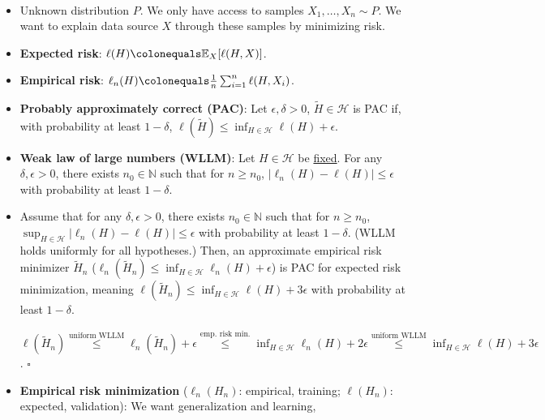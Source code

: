 \documentclass[8pt,a4paper]{extarticle}
\renewcommand{\proof}[1]{\begin{tcolorbox}#1 \hfill $\square$\end{tcolorbox}}
\newcommand{\E}{\mathbb{E}}
\newenvironment{topic}[1]
{\textbf{\sffamily \colorbox{black}{\rlap{\textbf{\textcolor{white}{#1}}}\hspace{\linewidth}\hspace{-2\fboxsep}}} \\ \vspace{0.2cm}}
{}
\begin{document}
\begin{multicols*}{2}
    \begin{topic}{Risk minimization}
        \begin{itemize}
            \item Unknown distribution $P$. We only have access to samples $X_1, \ldots, X_n \sim P$. We want to
                  explain data source $X$ through these samples by minimizing risk.
            \item \textbf{Expected risk}: $\ell(H) \colonequals \E_X[\ell(H, X)]$.
            \item \textbf{Empirical risk}: $\ell_n(H) \colonequals \frac{1}{n} \sum_{i=1}^{n} \ell(H, X_i)$.
            \item \textbf{Probably approximately correct (PAC)}: Let $\epsilon, \delta > 0$,
                  $\tilde{H} \in \mathcal{H}$ is PAC if, with probability at least $1-\delta$,
                  $\ell(\tilde{H}) \leq \inf_{H \in \mathcal{H}} \ell(H) + \epsilon$.
            \item \textbf{Weak law of large numbers (WLLM)}: Let $H \in \mathcal{H}$ be
                  \underline{fixed}. For any $\delta,\epsilon > 0$, there exists $n_0 \in \mathbb{N}$
                  such that for $n \geq n_0$, $|\ell_n(H) - \ell(H)| \leq \epsilon$ with probability
                  at least $1-\delta$.
            \item Assume that for any $\delta, \epsilon > 0$, there exists $n_0 \in \mathbb{N}$ such that for $n \geq
                      n_0$, $\sup_{H\in \mathcal{H}} |\ell_n(H) - \ell(H)| \leq \epsilon$ with probability at least
                  $1-\delta$. (WLLM holds uniformly for all hypotheses.) Then, an approximate empirical risk
                  minimizer $\tilde{H}_n$ ($\ell_n(\tilde{H}_n) \leq \inf_{H \in \mathcal{H}} \ell_n(H) + \epsilon$)
                  is PAC for expected risk minimization, meaning $\ell(\tilde{H}_n) \leq \inf_{H \in \mathcal{H}}
                      \ell(H) + 3 \epsilon$ with probability at least $1-\delta$. \proof{$\ell(\tilde{H}_n)
                          \overset{\text{uniform WLLM}}{\leq} \ell_n(\tilde{H}_n) + \epsilon \overset{\text{emp. risk
                                  min.}}{\leq} \inf_{H \in \mathcal{H}} \ell_n(H) + 2 \epsilon \overset{\text{uniform WLLM}}{\leq}
                          \inf_{H \in \mathcal{H}} \ell(H) + 3 \epsilon$.}
            \item \textbf{Empirical risk minimization} ($\ell_n(H_n)$: empirical, training; $\ell(H_n)$: expected, validation): We want generalization and learning,
                  \begin{itemize}

\end{itemize}
\end{itemize}
\end{topic}
\end{multicols*}
\end{document}
